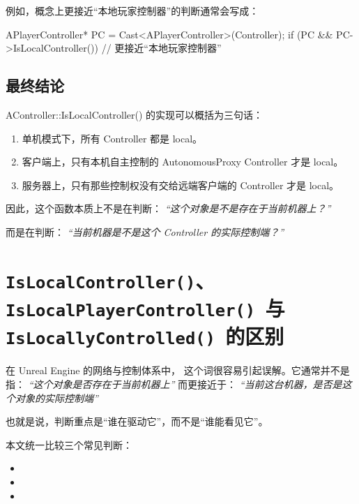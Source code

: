 例如，概念上更接近“本地玩家控制器”的判断通常会写成：
\begin{code}
	APlayerController* PC = Cast<APlayerController>(Controller);
	if (PC && PC->IsLocalController())
	{
		// 更接近“本地玩家控制器”
	}
\end{code}

\subsection{最终结论}

AController::IsLocalController() 的实现可以概括为三句话：

\begin{enumerate}
	\item 单机模式下，所有 Controller 都是 local。
	\item 客户端上，只有本机自主控制的 AutonomousProxy Controller 才是 local。
	\item 服务器上，只有那些控制权没有交给远端客户端的 Controller 才是 local。
\end{enumerate}

因此，这个函数本质上不是在判断：	\emph{“这个对象是不是存在于当前机器上？”}

而是在判断：	\emph{“当前机器是不是这个 Controller 的实际控制端？”}









\section{\texttt{IsLocalController()}、\texttt{IsLocalPlayerController() }与 \\ \texttt{IsLocallyControlled() }的区别}
在 Unreal Engine 的网络与控制体系中， 这个词很容易引起误解。它通常并不是指：
\emph{“这个对象是否存在于当前机器上”}
而更接近于：	\emph{“当前这台机器，是否是这个对象的实际控制端”}

也就是说，判断重点是“谁在驱动它”，而不是“谁能看见它”。

本文统一比较三个常见判断：
\begin{itemize}
	\item {}
	\item {}
	\item {}
\end{itemize}


